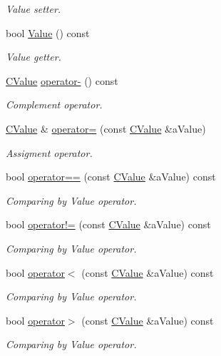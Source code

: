 \begin{DoxyCompactItemize}
\begin{DoxyCompactList}\small\item\em Value setter. \end{DoxyCompactList}\item 
bool \hyperlink{class_c_value__bool_1_1_c_value_a78e9392ca4d446ed32a83ad5a89b075d}{Value} () const
\begin{DoxyCompactList}\small\item\em Value getter. \end{DoxyCompactList}\item 
\hyperlink{class_c_value__bool_1_1_c_value}{C\+Value} \hyperlink{class_c_value__bool_1_1_c_value_a6fe95b37e5928d4ea12b8bfcdafc0027}{operator-\/} () const
\begin{DoxyCompactList}\small\item\em Complement operator. \end{DoxyCompactList}\item 
\hyperlink{class_c_value__bool_1_1_c_value}{C\+Value} \& \hyperlink{class_c_value__bool_1_1_c_value_ace6035c9ce867111440ef2c9c336852f}{operator=} (const \hyperlink{class_c_value__bool_1_1_c_value}{C\+Value} \&a\+Value)
\begin{DoxyCompactList}\small\item\em Assigment operator. \end{DoxyCompactList}\item 
bool \hyperlink{class_c_value__bool_1_1_c_value_aa0ef6517b9d79e30e198d970ebb121c9}{operator==} (const \hyperlink{class_c_value__bool_1_1_c_value}{C\+Value} \&a\+Value) const
\begin{DoxyCompactList}\small\item\em Comparing by Value operator. \end{DoxyCompactList}\item 
bool \hyperlink{class_c_value__bool_1_1_c_value_ad77db9403e1e923b324aa919108609e6}{operator!=} (const \hyperlink{class_c_value__bool_1_1_c_value}{C\+Value} \&a\+Value) const
\begin{DoxyCompactList}\small\item\em Comparing by Value operator. \end{DoxyCompactList}\item 
bool \hyperlink{class_c_value__bool_1_1_c_value_ac23e4f8e65e397ae113818bf679f438f}{operator$<$} (const \hyperlink{class_c_value__bool_1_1_c_value}{C\+Value} \&a\+Value) const
\begin{DoxyCompactList}\small\item\em Comparing by Value operator. \end{DoxyCompactList}\item 
bool \hyperlink{class_c_value__bool_1_1_c_value_ac1f4a9bb08a0538073455f303f853c12}{operator$>$} (const \hyperlink{class_c_value__bool_1_1_c_value}{C\+Value} \&a\+Value) const
\begin{DoxyCompactList}\small\item\em Comparing by Value operator. \end{DoxyCompactList}\end{DoxyCompactItemize}
